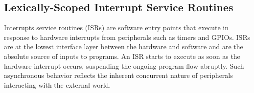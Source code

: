 \documentclass[sigplan,10pt,review,anonymous]{acmart}\settopmatter{printfolios=true,printccs=false,printacmref=false}
\newcommand{\CEU}{\textsc{C\'{e}u}\xspace}
\begin{document}

\subsection{Lexically-Scoped Interrupt Service Routines}
\label{sec.isrs}

Interrupts service routines (ISRs) are software entry points that execute in
response to hardware interrupts from peripherals such as timers and GPIOs.
ISRs are at the lowest interface layer between the hardware and software and
are the absolute source of inputs to programs.
%
An ISR starts to execute as soon as the hardware interrupt occurs, suspending
the ongoing program flow abruptly.
Such asynchronous behavior reflects the inherent concurrent nature of
peripherals interacting with the external world.

\end{document}
